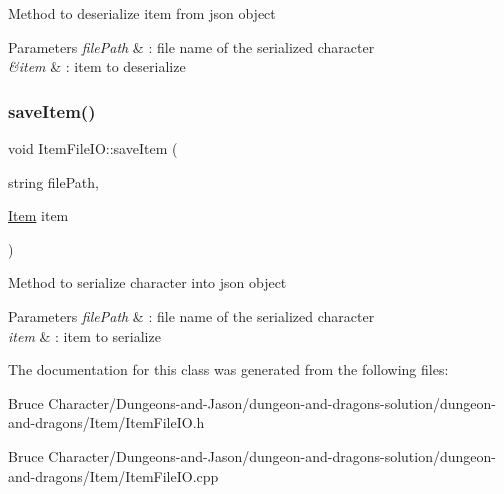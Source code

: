 Method to deserialize item from json object 
\begin{DoxyParams}{Parameters}
{\em file\+Path} & \+: file name of the serialized character \\
\hline
{\em \&item} & \+: item to deserialize \\
\hline
\end{DoxyParams}
\hypertarget{class_item_file_i_o_a573d19f26b2ad842d1aa91122665d2fc}{}\label{class_item_file_i_o_a573d19f26b2ad842d1aa91122665d2fc} 
\subsubsection{\texorpdfstring{save\+Item()}{saveItem()}}
{\footnotesize\ttfamily void Item\+File\+I\+O\+::save\+Item (\begin{DoxyParamCaption}\item[{string}]{file\+Path,  }\item[{\hyperlink{class_item}{Item}}]{item }\end{DoxyParamCaption})}

Method to serialize character into json object 
\begin{DoxyParams}{Parameters}
{\em file\+Path} & \+: file name of the serialized character \\
\hline
{\em item} & \+: item to serialize \\
\hline
\end{DoxyParams}


The documentation for this class was generated from the following files\+:\begin{DoxyCompactItemize}
\item 
Bruce Character/\+Dungeons-\/and-\/\+Jason/dungeon-\/and-\/dragons-\/solution/dungeon-\/and-\/dragons/\+Item/Item\+File\+I\+O.\+h\item 
Bruce Character/\+Dungeons-\/and-\/\+Jason/dungeon-\/and-\/dragons-\/solution/dungeon-\/and-\/dragons/\+Item/Item\+File\+I\+O.\+cpp\end{DoxyCompactItemize}
